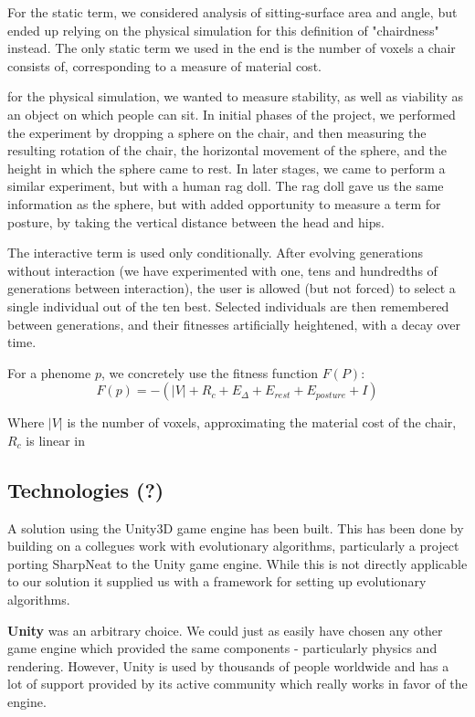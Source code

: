 For the static term, we considered analysis of sitting-surface area and angle,
but ended up relying on the physical simulation for this definition of
"chairdness" instead. The only static term we used in the end is the number of
voxels a chair consists of, corresponding to a measure of material cost.

for the physical simulation, we wanted to measure stability, as well as
viability as an object on which people can sit. In initial phases of the
project, we performed the experiment by dropping a sphere on the chair, and then
measuring the resulting rotation of the chair, the horizontal movement of the
sphere, and the height in which the sphere came to rest. In later stages, we
came to perform a similar experiment, but with a human rag doll. The rag doll
gave us the same information as the sphere, but with added opportunity to
measure a term for posture, by taking the vertical distance between the head and
hips.

The interactive term is used only conditionally. After evolving generations
without interaction (we have experimented with one, tens and hundredths of
generations between interaction), the user is allowed (but not forced) to select
a single individual out of the ten best. Selected individuals are then
remembered between generations, and their fitnesses artificially heightened,
with a decay over time.

For a phenome $p$, we concretely use the fitness function $F(P)$:
$$F(p) = -(|V| + R_c + E_{\Delta} + E_{rest} + E_{posture} + I)$$

Where $|V|$ is the number of voxels, approximating the material cost of the
chair, $R_c$ is linear in 
\subsection{Technologies (?)}

A solution using the Unity3D\cite{web:unity} game engine has been built. This has been done by building on a collegues work\cite{web:unityneat} with evolutionary algorithms, particularly a project porting SharpNeat\cite{web:sharpneat} to the Unity game engine.
While this is not directly applicable to our solution it supplied us with a framework for setting up evolutionary algorithms.
    
\textbf{Unity} was an arbitrary choice. We could just as easily have chosen any other game engine which provided the same components - particularly physics and rendering. However, Unity is used by thousands of people worldwide and has a lot of support provided by its active community which really works in favor of the engine.

